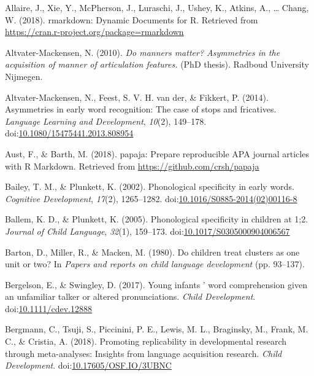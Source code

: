 \documentclass[man]{apa6}
\theoremstyle{definition}
\theoremstyle{definition}
\theoremstyle{definition}
\theoremstyle{remark}
\begin{document}
\hypertarget{refs}{}
\hypertarget{ref-RMarkdown}{}
Allaire, J., Xie, Y., McPherson, J., Luraschi, J., Ushey, K., Atkins,
A., \ldots{} Chang, W. (2018). rmarkdown: Dynamic Documents for R.
Retrieved from \url{https://cran.r-project.org/package=rmarkdown}

\hypertarget{ref-Altvater2010}{}
Altvater-Mackensen, N. (2010). \emph{Do manners matter? Asymmetries in
the acquisition of manner of articulation features.} (PhD thesis).
Radboud University Nijmegen.

\hypertarget{ref-Altvater2014}{}
Altvater-Mackensen, N., Feest, S. V. H. van der, \& Fikkert, P. (2014).
Asymmetries in early word recognition: The case of stops and fricatives.
\emph{Language Learning and Development}, \emph{10}(2), 149--178.
doi:\href{https://doi.org/10.1080/15475441.2013.808954}{10.1080/15475441.2013.808954}

\hypertarget{ref-papaja}{}
Aust, F., \& Barth, M. (2018). papaja: Prepare reproducible APA journal
articles with R Markdown. Retrieved from
\url{https://github.com/crsh/papaja}

\hypertarget{ref-Bailey2002}{}
Bailey, T. M., \& Plunkett, K. (2002). Phonological specificity in early
words. \emph{Cognitive Development}, \emph{17}(2), 1265--1282.
doi:\href{https://doi.org/10.1016/S0885-2014(02)00116-8}{10.1016/S0885-2014(02)00116-8}

\hypertarget{ref-Ballem2005}{}
Ballem, K. D., \& Plunkett, K. (2005). Phonological specificity in
children at 1;2. \emph{Journal of Child Language}, \emph{32}(1),
159--173.
doi:\href{https://doi.org/10.1017/S0305000904006567}{10.1017/S0305000904006567}

\hypertarget{ref-Barton1980}{}
Barton, D., Miller, R., \& Macken, M. (1980). Do children treat clusters
as one unit or two? In \emph{Papers and reports on child language
development} (pp. 93--137).

\hypertarget{ref-Bergelson2017}{}
Bergelson, E., \& Swingley, D. (2017). Young infants ' word
comprehension given an unfamiliar talker or altered pronunciations.
\emph{Child Development}.
doi:\href{https://doi.org/10.1111/cdev.12888}{10.1111/cdev.12888}

\hypertarget{ref-Bergmann2018}{}
Bergmann, C., Tsuji, S., Piccinini, P. E., Lewis, M. L., Braginsky, M.,
Frank, M. C., \& Cristia, A. (2018). Promoting replicability in
developmental research through meta-analyses: Insights from language
acquisition research. \emph{Child Development}.
doi:\href{https://doi.org/10.17605/OSF.IO/3UBNC}{10.17605/OSF.IO/3UBNC}
\end{document}
